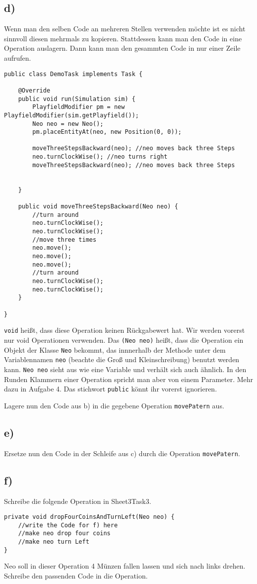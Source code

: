\subsection*{d)}
	\begin{Infobox}[Operation]
		Wenn man den selben Code an mehreren Stellen verwenden möchte ist es nicht sinnvoll diesen mehrmals zu kopieren. Stattdessen kann man den Code in eine Operation auslagern. Dann kann man den gesammten Code in nur einer Zeile  aufrufen.
				\begin{lstlisting}
public class DemoTask implements Task {
    
    @Override
    public void run(Simulation sim) {
        PlayfieldModifier pm = new PlayfieldModifier(sim.getPlayfield());
        Neo neo = new Neo();
        pm.placeEntityAt(neo, new Position(0, 0));
     
        moveThreeStepsBackward(neo); //neo moves back three Steps
        neo.turnClockWise(); //neo turns right
        moveThreeStepsBackward(neo); //neo moves back three Steps
	
        
    }
    
    public void moveThreeStepsBackward(Neo neo) {
        //turn around
        neo.turnClockWise();
        neo.turnClockWise();
        //move three times
        neo.move();
        neo.move();
        neo.move();
        //turn around
        neo.turnClockWise();
        neo.turnClockWise();
    }
    
}
		\end{lstlisting}
\lstinline{void} heißt, dass diese Operation keinen Rückgabewert hat. 
Wir werden vorerst nur void Operationen verwenden. 
Das \lstinline{(Neo neo)} heißt, dass die Operation ein Objekt der Klasse \lstinline{Neo} bekommt, das innnerhalb der Methode unter dem Variablennamen \lstinline{neo} (beachte die Groß und Kleinschreibung) benutzt werden kann.
\lstinline{Neo neo} sieht aus wie eine Variable und verhält sich auch ähnlich.
In den Runden Klammern einer Operation spricht man aber von einem Parameter.
Mehr dazu in Aufgabe 4. 
Das stichwort \lstinline{public} könnt ihr vorerst ignorieren.
 	\end{Infobox}
Lagere nun den Code aus b) in die gegebene Operation  \lstinline{movePatern} aus.
\subsection*{e)}
Ersetze nun den Code in der Schleife aus c) durch die Operation  \lstinline{movePatern}.
\subsection*{f)}
Schreibe die folgende Operation in Sheet3Task3.
\begin{lstlisting}
private void dropFourCoinsAndTurnLeft(Neo neo) {
    //write the Code for f) here
    //make neo drop four coins
    //make neo turn Left
}
\end{lstlisting}
Neo soll in dieser Operation 4 Münzen fallen lassen und sich nach links drehen. Schreibe den passenden Code in die Operation.
